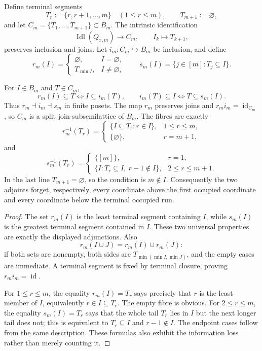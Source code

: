 Define terminal segments
\[
 T_r:=\{r,r+1,\ldots,m\}\quad(1\leq r\leq m),
 \qquad T_{m+1}:=\varnothing,
\]
and let $C_m=\{T_1,\ldots,T_{m+1}\}\subset B_m$.  The intrinsic identification
\[
 \operatorname{Idl}(Q_{x,m})\longrightarrow C_m,
 \qquad I_k\longmapsto T_{k+1},
\]
preserves inclusion and joins.  Let $i_m:C_m\hookrightarrow B_m$ be inclusion,
and define
\[
 r_m(I)=
 \begin{cases}
 \varnothing,&I=\varnothing,\\
 T_{\min I},&I\ne\varnothing,
 \end{cases}
 \qquad
 s_m(I)=\{j\in[m]:T_j\subseteq I\}.
\]

\begin{theorem}
\label{thm:ds-chain-cube}
For $I\in B_m$ and $T\in C_m$,
\[
 r_m(I)\subseteq T\iff I\subseteq i_m(T),
 \qquad
 i_m(T)\subseteq I\iff T\subseteq s_m(I).
\]
Thus $r_m\dashv i_m\dashv s_m$ in finite posets.  The map $r_m$ preserves
joins and $r_mi_m=\operatorname{id}_{C_m}$, so $C_m$ is a split join-subsemilattice
of $B_m$.  The fibres are exactly
\[
 r_m^{-1}(T_r)=
 \begin{cases}
 \{I\subseteq T_r:r\in I\},&1\leq r\leq m,\\
 \{\varnothing\},&r=m+1,
 \end{cases}
\]
and
\[
 s_m^{-1}(T_r)=
 \begin{cases}
 \{[m]\},&r=1,\\
 \{I:T_r\subseteq I,\ r-1\notin I\},&2\leq r\leq m+1.
 \end{cases}
\]
In the last line $T_{m+1}=\varnothing$, so the condition is $m\notin I$.
Consequently the two adjoints forget, respectively, every coordinate above the
first occupied coordinate and every coordinate below the terminal occupied run.
\end{theorem}

\begin{proof}
The set $r_m(I)$ is the least terminal segment containing $I$, while $s_m(I)$ is
the greatest terminal segment contained in $I$.  These two universal properties
are exactly the displayed adjunctions.  Also
\[
 r_m(I\cup J)=r_m(I)\cup r_m(J):
\]
if both sets are nonempty, both sides are
$T_{\min(\min I,\min J)}$, and the empty cases are immediate.  A terminal
segment is fixed by terminal closure, proving $r_mi_m=\operatorname{id}$.

For $1\leq r\leq m$, the equality $r_m(I)=T_r$ says precisely that $r$ is the
least member of $I$, equivalently $r\in I\subseteq T_r$.  The empty fibre is
obvious.  For $2\leq r\leq m$, the equality $s_m(I)=T_r$ says that the whole
tail $T_r$ lies in $I$ but the next longer tail does not; this is equivalent to
$T_r\subseteq I$ and $r-1\notin I$.  The endpoint cases follow from the same
description.  These formulas also exhibit the information loss rather than merely
counting it.
\end{proof}

